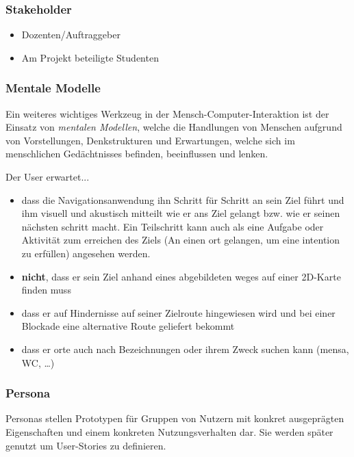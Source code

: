 \subsubsection*{Stakeholder}
\begin{itemize}
  \item Dozenten/Auftraggeber
  \item Am Projekt beteiligte Studenten
\end{itemize}

\subsubsection*{Mentale Modelle}
Ein weiteres wichtiges Werkzeug in der Mensch-\-Computer-\-Interaktion ist der Einsatz von \emph{mentalen Modellen}, welche die Handlungen von Menschen aufgrund von Vorstellungen, Denkstrukturen und Erwartungen, welche sich im menschlichen Gedächtnisses befinden, beeinflussen und lenken.\medskip

\noindent Der User erwartet...
\begin{itemize}
  \item dass die Navigationsanwendung ihn Schritt für Schritt an sein Ziel führt und ihm visuell und akustisch mitteilt wie er ans Ziel gelangt bzw. wie er seinen nächsten \gls{schritt} macht. Ein Teilschritt kann auch als eine Aufgabe oder Aktivität zum erreichen des Ziels (An einen \gls{ort} gelangen, um eine \gls{intention} zu erfüllen) angesehen werden.
  \item \textbf{nicht}, dass er sein Ziel anhand eines abgebildeten \gls{weg}es auf einer 2D-Karte finden muss
  \item dass er auf Hindernisse auf seiner Zielroute hingewiesen wird und bei einer Blockade eine alternative Route geliefert bekommt
  \item dass er \gls{ort}e auch nach Bezeichnungen oder ihrem Zweck suchen kann (\gls{mensa}, WC, \dots)
\end{itemize}

\subsubsection*{Persona}
Personas stellen Prototypen für Gruppen von Nutzern mit konkret ausgeprägten Eigenschaften und einem konkreten Nutzungsverhalten dar. Sie werden später genutzt um User-Stories zu definieren.

